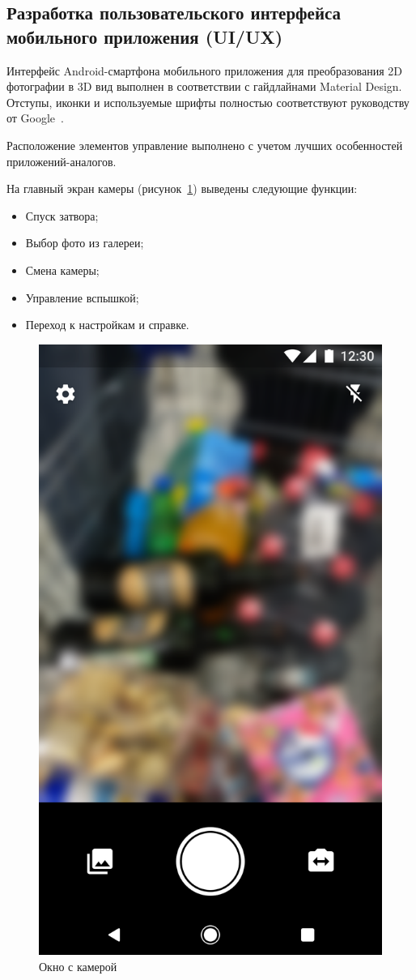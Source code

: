 \subsection{Разработка пользовательского интерфейса мобильного приложения (UI/UX)}

Интерфейс Android-смартфона мобильного приложения для преобразования 2D фотографии в 3D вид выполнен в соответствии с гайдлайнами Material Design. Отступы, иконки и используемые шрифты полностью соответствуют руководству от Google~\cite{google}. 

Расположение элементов управление выполнено с учетом лучших особенностей приложений-аналогов.

На главный экран камеры (рисунок~\ref{fig:Artboard}) выведены следующие функции:

\begin{itemize}
	\item Спуск затвора;
	\item Выбор фото из галереи;
	\item Смена камеры;
	\item Управление вспышкой;
	\item Переход к настройкам и справке.
\end{itemize}

\begin{figure}[H]
	\centering
	\includegraphics[width=0.6\linewidth]{pics/Artboard}
	\caption{Окно с камерой}
	\label{fig:Artboard}
\end{figure}

